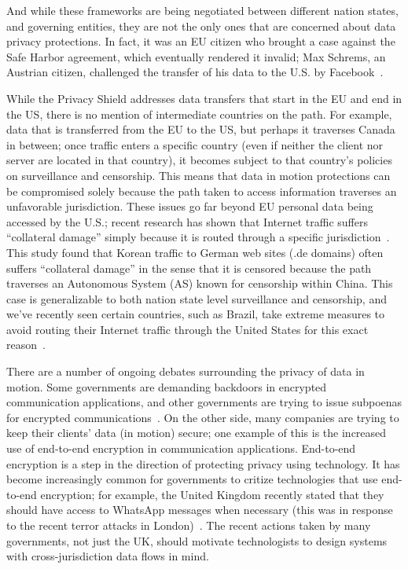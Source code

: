 And while these frameworks are being negotiated between different nation states, and governing entities, they are not the only ones that are concerned about data privacy protections.  In fact, it was an EU citizen who brought a case against the Safe Harbor agreement, which eventually rendered it invalid; Max Schrems, an Austrian citizen, challenged the transfer of his data to the U.S. by Facebook~\cite{schrems}.  

While the Privacy Shield addresses data transfers that start in the EU and end in the US, there is no mention of intermediate countries on the path.  For example, data that is transferred from the EU to the US, but perhaps it traverses Canada in between; once traffic enters a specific country (even if neither the client nor server are located in that country), it becomes subject to that country's policies on surveillance and censorship.  This means that data in motion protections can be compromised solely because the path taken to access information traverses an unfavorable jurisdiction.    These issues go far beyond EU personal data being accessed by the U.S.; recent research has shown that Internet traffic suffers ``collateral damage'' simply because it is routed through a specific jurisdiction~\cite{levis2012collateral}.  This study found that Korean traffic to German web sites (.de domains) often suffers ``collateral damage'' in the sense that it is censored because the path traverses an Autonomous System (AS) known for censorship within China.  This case is generalizable to both nation state level surveillance and censorship, and we've recently seen certain countries, such as Brazil, take extreme measures to avoid routing their Internet traffic through the United States for this exact reason~\cite{brazil}.    

There are a number of ongoing debates surrounding the privacy of data in motion.  Some governments are demanding backdoors in encrypted communication applications, and other governments are trying to issue subpoenas for encrypted communications~\cite{whatsapp_uk,signal_fbi}.  On the other side, many companies are trying to keep their clients' data (in motion) secure; one example of this is the increased use of end-to-end encryption in communication applications.  End-to-end encryption is a step in the direction of protecting privacy using technology.  It has become increasingly common for governments to critize technologies that use end-to-end encryption; for example, the United Kingdom recently stated that they should have access to WhatsApp messages when necessary (this was in response to the recent terror attacks in London)~\cite{uk_whatsapp}.  The recent actions taken by many governments, not just the UK, should motivate technologists to design systems with cross-jurisdiction data flows in mind.  

